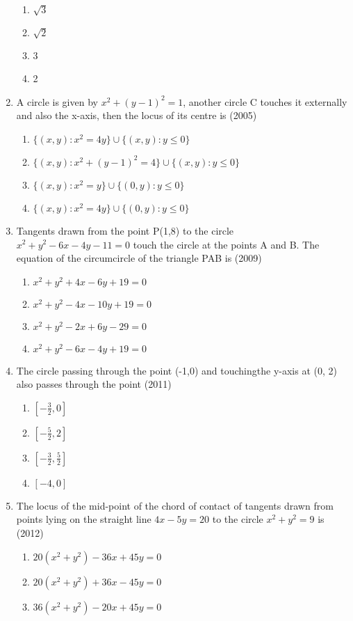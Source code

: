 \documentclass[12pt]{article}
\providecommand{\sbrak}[1]{\ensuremath{{}\left[#1\right]}}
\begin{document}
\begin{enumerate}
\begin{enumerate}
\item $\sqrt{3}$
\item $\sqrt{2}$
\item 3
\item 2
\end{enumerate}
\item A circle is given by $x^2+(y-1)^2=1$, another circle C touches it externally and also the x-axis, then the locus of its centre is (2005)
\begin{enumerate}
\item $\{(x,y):x^2=4y\}\cup\{(x,y):y\leq 0\}$
\item $\{(x,y):x^2+(y-1)^2=4\}\cup\{(x,y):y\leq 0\}$
\item $\{(x,y):x^2=y\}\cup\{(0,y):y\leq 0\}$
\item $\{(x,y):x^2=4y\}\cup\{(0,y):y\leq 0\}$
\end{enumerate}
\item Tangents drawn from the point P(1,8) to the circle $x^2+y^2-6x-4y-11=0$ touch the circle at the points A and B. The equation of the circumcircle of the triangle PAB is (2009)
\begin{enumerate}
\item $x^2+y^2+4x-6y+19=0$
\item $x^2+y^2-4x-10y+19=0$
\item $x^2+y^2-2x+6y-29=0$
\item $x^2+y^2-6x-4y+19=0$
\end{enumerate}
\item The circle passing through the point (-1,0) and touchingthe y-axis at (0, 2) also passes through the point (2011)
\begin{enumerate}
\item  $\sbrak{-\frac{3}{2},0}$
\item  $\sbrak{-\frac{5}{2},2}$
\item  $\sbrak{-\frac{3}{2},\frac{5}{2}}$
\item  $\sbrak{-4,0}$
\end{enumerate}
\item The locus of the mid-point of the chord of contact of tangents drawn from points lying on the straight line $4x-5y=20$ to the circle $x^2+y^2=9$ is (2012)
\begin{enumerate}
\item $20(x^2+y^2)-36x+45y=0$
\item $20(x^2+y^2)+36x-45y=0$
\item $36(x^2+y^2)-20x+45y=0$

\end{enumerate}
\end{enumerate}
\end{document}
